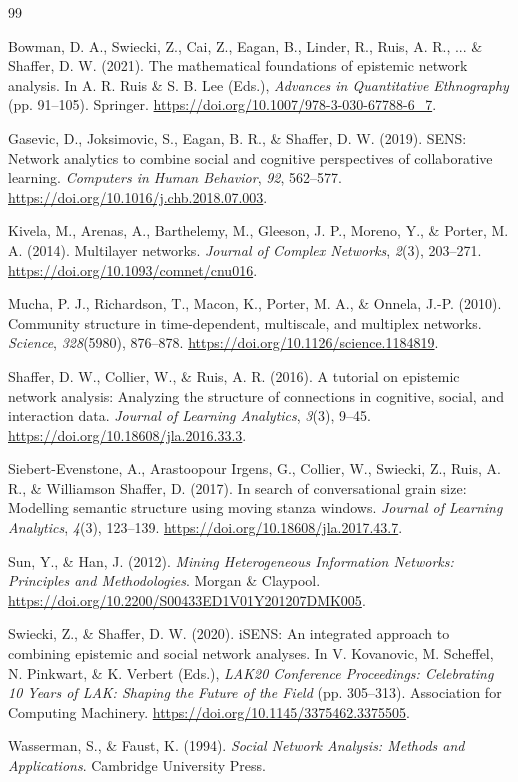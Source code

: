\documentclass[11pt]{article}
\theoremstyle{definition}
\begin{document}
\begin{thebibliography}{99}

Bowman, D. A., Swiecki, Z., Cai, Z., Eagan, B., Linder, R., Ruis, A. R., ... &
Shaffer, D. W. (2021). The mathematical foundations of epistemic network
analysis. In A. R. Ruis \& S. B. Lee (Eds.), \emph{Advances in Quantitative
Ethnography} (pp. 91--105). Springer.
\url{https://doi.org/10.1007/978-3-030-67788-6_7}.

Gasevic, D., Joksimovic, S., Eagan, B. R., \& Shaffer, D. W. (2019). SENS:
Network analytics to combine social and cognitive perspectives of collaborative
learning. \emph{Computers in Human Behavior}, \emph{92}, 562--577.
\url{https://doi.org/10.1016/j.chb.2018.07.003}.

Kivela, M., Arenas, A., Barthelemy, M., Gleeson, J. P., Moreno, Y., \& Porter,
M. A. (2014). Multilayer networks. \emph{Journal of Complex Networks},
\emph{2}(3), 203--271. \url{https://doi.org/10.1093/comnet/cnu016}.

Mucha, P. J., Richardson, T., Macon, K., Porter, M. A., \& Onnela, J.-P.
(2010). Community structure in time-dependent, multiscale, and multiplex
networks. \emph{Science}, \emph{328}(5980), 876--878.
\url{https://doi.org/10.1126/science.1184819}.

Shaffer, D. W., Collier, W., \& Ruis, A. R. (2016). A tutorial on epistemic
network analysis: Analyzing the structure of connections in cognitive, social,
and interaction data. \emph{Journal of Learning Analytics}, \emph{3}(3),
9--45. \url{https://doi.org/10.18608/jla.2016.33.3}.

Siebert-Evenstone, A., Arastoopour Irgens, G., Collier, W., Swiecki, Z.,
Ruis, A. R., \& Williamson Shaffer, D. (2017). In search of conversational
grain size: Modelling semantic structure using moving stanza windows.
\emph{Journal of Learning Analytics}, \emph{4}(3), 123--139.
\url{https://doi.org/10.18608/jla.2017.43.7}.

Sun, Y., \& Han, J. (2012). \emph{Mining Heterogeneous Information Networks:
Principles and Methodologies}. Morgan \& Claypool.
\url{https://doi.org/10.2200/S00433ED1V01Y201207DMK005}.

Swiecki, Z., \& Shaffer, D. W. (2020). iSENS: An integrated approach to
combining epistemic and social network analyses. In V. Kovanovic, M. Scheffel,
N. Pinkwart, \& K. Verbert (Eds.), \emph{LAK20 Conference Proceedings:
Celebrating 10 Years of LAK: Shaping the Future of the Field} (pp. 305--313).
Association for Computing Machinery.
\url{https://doi.org/10.1145/3375462.3375505}.

Wasserman, S., \& Faust, K. (1994). \emph{Social Network Analysis: Methods and
Applications}. Cambridge University Press.

\end{thebibliography}
\end{document}
